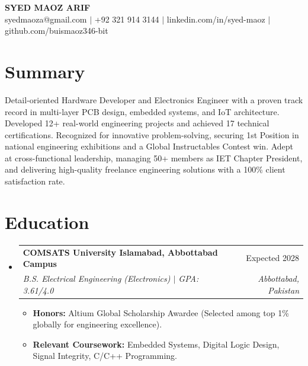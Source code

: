 \documentclass[letterpaper,10pt]{article}
\makeatletter
\newcommand{\resumeItem}[1]{\item\small{#1 \vspace{-2pt}}}
\newcommand{\resumeSubheading}[4]{
  \vspace{-1pt}\item
    \begin{tabular*}{0.97\textwidth}[t]{l@{\extracolsep{\fill}}r}
      \textbf{#1} & #2 \\
      \textit{\small#3} & \textit{\small #4} \\
    \end{tabular*}\vspace{-5pt}
}
\makeatother
\begin{document}
\begin{center}
    {\Huge \textbf{SYED MAOZ ARIF}} \\ \vspace{5pt}
    \small 
    syedmaoza@gmail.com $|$ +92 321 914 3144 $|$ linkedin.com/in/syed-maoz $|$ github.com/buismaoz346-bit
\end{center}

\section{Summary}
\vspace{2pt}
\small{Detail-oriented Hardware Developer and Electronics Engineer with a proven track record in multi-layer PCB design, embedded systems, and IoT architecture. Developed 12+ real-world engineering projects and achieved 17 technical certifications. Recognized for innovative problem-solving, securing 1st Position in national engineering exhibitions and a Global Instructables Contest win. Adept at cross-functional leadership, managing 50+ members as IET Chapter President, and delivering high-quality freelance engineering solutions with a 100\% client satisfaction rate.}

\section{Education}
  \begin{itemize}[leftmargin=0.15in, label={}]
    \resumeSubheading
      {COMSATS University Islamabad, Abbottabad Campus}{Expected 2028}
      {B.S. Electrical Engineering (Electronics) $|$ GPA: 3.61/4.0}{Abbottabad, Pakistan}
      \begin{itemize}[leftmargin=0.15in, label=\textbullet]
        \resumeItem{\textbf{Honors:} Altium Global Scholarship Awardee (Selected among top 1\% globally for engineering excellence).}
        \resumeItem{\textbf{Relevant Coursework:} Embedded Systems, Digital Logic Design, Signal Integrity, C/C++ Programming.}
      \end{itemize}
  \end{itemize}

\end{document}
